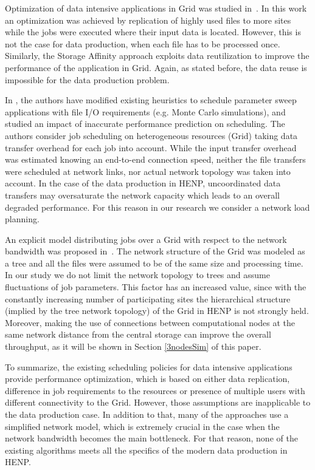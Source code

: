 \documentclass{svjour3}                     %
\begin{document}
Optimization of data intensive applications in Grid was studied
in~\cite{Globus_scheduler}. In this work an optimization was achieved by
replication of highly used files to more sites while the jobs were executed
where their input data is located. However, this is not the case for data
production, when each file has to be processed once. Similarly, the Storage Affinity  \cite{StorageAffinity} approach exploits data reutilization to improve the performance of the application in Grid. Again, as stated before, the data reuse is impossible for the data production problem.

In \cite{XSuffarage}, the authors have modified existing heuristics  to schedule parameter sweep applications with file I/O requirements (e.g. Monte Carlo simulations), and studied an impact of inaccurate performance prediction on scheduling. The authors consider job scheduling on heterogeneous resources (Grid) taking data transfer overhead for each job into account. While the input transfer overhead was estimated knowing an end-to-end connection speed, neither the file transfers were scheduled at network links, nor actual network topology was taken into account. In the case of the data production in HENP, uncoordinated data transfers may oversaturate the network capacity which leads to an overall degraded performance. For this reason in our research we consider a network load planning.

An explicit model distributing jobs over a Grid with respect to the network
bandwidth was proposed in~\cite{Trees}. The network structure of the Grid was
modeled as a tree and all the files were assumed to be of the same size and
processing time. In our study we do not limit the network topology to trees
and assume fluctuations of job parameters. This factor has an increased value, since with the constantly increasing number of participating sites the hierarchical structure (implied by the tree network topology) of the Grid in HENP is not strongly held. Moreover, making the use of connections between computational nodes at the same network distance from the central storage can improve the overall throughput, as it will be shown in Section \ref{3nodesSim} of this paper.

To summarize, the existing scheduling policies for data intensive applications provide performance optimization, which is based on either data replication, difference in job requirements to the resources or presence of multiple users with different connectivity to the Grid. However, those assumptions are inapplicable to the data production case. In addition to that, many of the approaches use a simplified network model, which is extremely crucial in the case when the network bandwidth becomes the main bottleneck. For that reason, none of the existing algorithms meets all the specifics of the modern data production in HENP.
\end{document}
